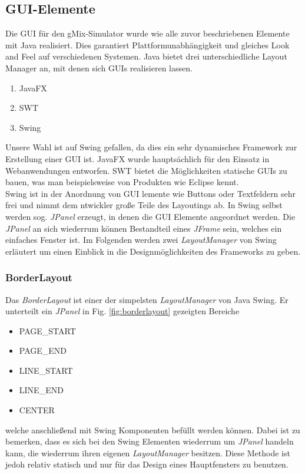 \documentclass[a4paper, 11pt]{article} %
\begin{document}
\subsection{GUI-Elemente}
Die GUI für den gMix-Simulator wurde wie alle zuvor beschriebenen Elemente mit Java realisiert. Dies garantiert Plattformunabhängigkeit und gleiches Look and Feel auf verschiedenen Systemen. Java bietet drei unterschiedliche Layout Manager an, mit denen sich GUIs realisieren lassen.
\begin{enumerate}
\item JavaFX
\item SWT
\item Swing
\end{enumerate}
Unsere Wahl ist auf Swing gefallen, da dies ein sehr dynamisches Framework zur Erstellung einer GUI ist. JavaFX wurde hauptsächlich für den Einsatz in Webanwendungen entworfen. SWT bietet die Möglichkeiten statische GUIs zu bauen, was man beispielsweise von Produkten wie  Eclipse kennt.\\

Swing ist in der Anordnung von GUI lemente wie Buttons oder Textfeldern sehr frei und nimmt dem ntwickler große Teile des Layoutings ab. In Swing selbst werden sog. \emph{JPanel} erzeugt, in denen die GUI Elemente angeordnet werden. Die \emph{JPanel} an sich wiederrum können Bestandteil eines \emph{JFrame} sein, welches ein einfaches Fenster ist. Im Folgenden werden zwei \emph{LayoutManager} von Swing erläutert um einen Einblick in die Designmöglichkeiten des Frameworks zu geben.

\subsubsection{BorderLayout}
Das \emph{BorderLayout} ist einer der simpelsten \emph{LayoutManager} von Java Swing. Er unterteilt ein \emph{JPanel} in Fig. \ref{fig:borderlayout} gezeigten Bereiche
\begin{itemize}
    \item {PAGE\_START}
    \item {PAGE\_END}
    \item {LINE\_START}
    \item {LINE\_END}
    \item {CENTER}
\end{itemize}
welche anschließend mit Swing Komponenten befüllt werden können. Dabei ist zu bemerken, dass es sich bei den Swing Elementen wiederrum um \emph{JPanel} handeln kann, die wiederrum ihren eigenen \emph{LayoutManager} besitzen. Diese Methode ist jedoh relativ statisch und nur für das Design eines Hauptfensters zu benutzen.
\end{document}
